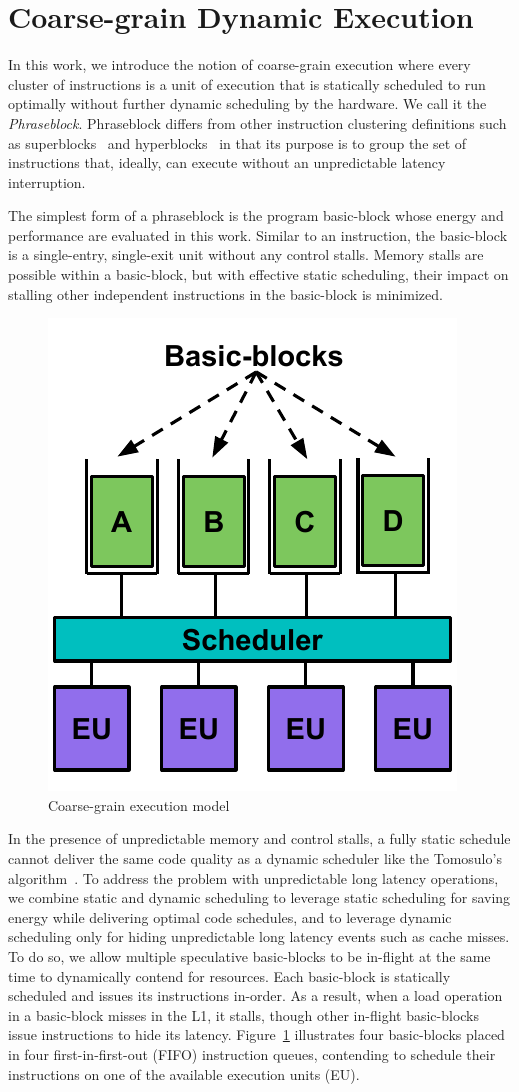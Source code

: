 \section{Coarse-grain Dynamic Execution}
\label{sec:course_grain}

In this work, we introduce the notion of coarse-grain execution where every
cluster of instructions is a unit of execution that is statically scheduled to
run optimally without further dynamic scheduling by the hardware. We call it the
{\it{Phraseblock}}. Phraseblock differs from other instruction clustering
definitions such as superblocks~\cite{superblock} and
hyperblocks~\cite{hyperblock} in that its purpose is to group the set of
instructions that, ideally, can execute without an unpredictable latency
interruption. 

The simplest form of a phraseblock is the program basic-block whose energy and
performance are evaluated in this work. Similar to an instruction, the
basic-block is a single-entry, single-exit unit without any control stalls.
Memory stalls are possible within a basic-block, but with effective static
scheduling, their impact on stalling other independent instructions in the
basic-block is minimized.

\begin{figure}
	\centering
	\includegraphics[width=0.5\columnwidth]{fig/coarse_grain_sch.pdf} 
	\caption{Coarse-grain execution model}
	\label{fig:coarse_grain_sch}
\end{figure}

In the presence of unpredictable memory and control stalls, a fully static
schedule cannot deliver the same code quality as a dynamic scheduler like the
Tomosulo's algorithm~\cite{tomasulo}. To address the problem with unpredictable
long latency operations, we combine static and dynamic scheduling to leverage
static scheduling for saving energy while delivering optimal code schedules, and
to leverage dynamic scheduling only for hiding unpredictable long latency events
such as cache misses. To do so, we allow multiple speculative basic-blocks to be
in-flight at the same time to dynamically contend for resources.  Each
basic-block is statically scheduled and issues its instructions in-order.  As a
result, when a load operation in a basic-block misses in the L1, it stalls,
    though other in-flight basic-blocks issue instructions to hide its latency.
    Figure~\ref{fig:coarse_grain_sch} illustrates four basic-blocks placed in
    four first-in-first-out (FIFO) instruction queues, contending to schedule
    their instructions on one of the available execution units (EU).
